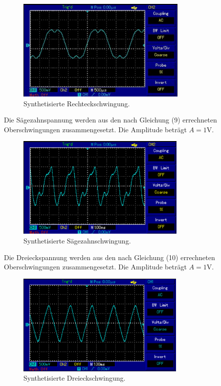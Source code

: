 \begin{figure}[H]
  \centering
  \includegraphics[height=5cm]{rechteck.PNG}
  \caption{Synthetisierte Rechteckschwingung.}
  \label{fig:rechteck}
\end{figure}

Die Sägezahnspannung werden aus den nach Gleichung (9) errechneten Oberschwingungen zusammengesetzt.
Die Amplitude beträgt $A = 1$V.

\begin{figure}[H]
  \centering
  \includegraphics[height=5cm]{saegezahn.PNG}
  \caption{Synthetisierte Sägezahnschwingung.}
  \label{fig:saegezahn}
\end{figure}

\pagebreak

Die Dreieckspannung werden aus den nach Gleichung (10) errechneten Oberschwingungen zusammengesetzt.
Die Amplitude beträgt $A = 1$V.

\begin{figure}[H]
  \centering
  \includegraphics[height=5cm]{dreieck.PNG}
  \caption{Synthetisierte Dreieckschwingung.}
  \label{fig:dreieck}
\end{figure}

